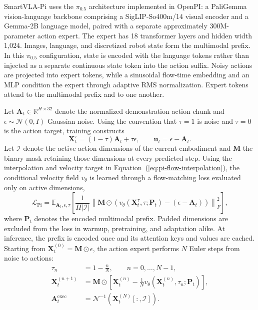 SmartVLA-Pi uses the $\pi_{0.5}$ architecture implemented in OpenPI:
a PaliGemma vision-language backbone comprising a SigLIP-So400m/14
visual encoder and a Gemma-2B language model, paired with a separate
approximately 300M-parameter action expert. The expert has 18 transformer
layers and hidden width 1,024. Images, language, and discretized robot
state form the multimodal prefix. In this $\pi_{0.5}$ configuration,
state is encoded with the language tokens rather than injected as a
separate continuous state token into the action suffix. Noisy actions
are projected into expert tokens, while a sinusoidal flow-time embedding
and an MLP condition the expert through adaptive RMS normalization.
Expert tokens attend to the multimodal prefix and to one another.

Let $\mathbf{A}_t\in\mathbb{R}^{H\times32}$ denote the normalized
demonstration action chunk and $\epsilon\sim\mathcal{N}(0,I)$ Gaussian
noise. Using the convention that $\tau=1$ is noise and $\tau=0$ is the
action target, training constructs
\begin{equation}
\label{eq:pi-flow-interpolation}
\mathbf{X}^{\tau}_t=(1-\tau)\mathbf{A}_t+\tau\epsilon,
\qquad \mathbf{u}_t=\epsilon-\mathbf{A}_t.
\end{equation}
Let $\mathcal{I}$ denote the active action dimensions of the current
embodiment and $\mathbf{M}$ the binary mask retaining those dimensions
at every predicted step. Using the interpolation and velocity target in
Equation~(\ref{eq:pi-flow-interpolation}), the conditional velocity field $v_\theta$
is learned through a flow-matching loss evaluated only on active dimensions,
\begin{equation}
\label{eq:pi-flow-loss}
\mathcal{L}_{\mathrm{Pi}}=
\mathbb{E}_{\mathbf{A}_t,\epsilon,\tau}\!
\left[\frac{1}{H|\mathcal{I}|}\left\|
\mathbf{M}\odot\left(
v_\theta(\mathbf{X}^{\tau}_t,\tau;\mathbf{P}_t)
-(\epsilon-\mathbf{A}_t)\right)\right\|_F^2\right],
\end{equation}
where $\mathbf{P}_t$ denotes the encoded multimodal prefix. Padded
dimensions are excluded from the loss in warmup, pretraining, and adaptation alike.
At inference, the prefix is encoded once and its attention keys and
values are cached. Starting from
$\mathbf{X}^{(0)}_t=\mathbf{M}\odot\epsilon$, the action expert performs
$N$ Euler steps from noise to actions:
\begin{equation}
\label{eq:pi-flow-inference}
\begin{aligned}
\tau_n&=1-\frac{n}{N},\qquad n=0,\ldots,N-1,\\
\mathbf{X}^{(n+1)}_t&=\mathbf{M}\odot\left[
\mathbf{X}^{(n)}_t-\frac{1}{N}v_\theta(\mathbf{X}^{(n)}_t,\tau_n;\mathbf{P}_t)\right],\\
\mathbf{A}^{\mathrm{exec}}_t&=
\mathcal{N}^{-1}\!\left(\mathbf{X}^{(N)}_t[:,\mathcal{I}]\right).
\end{aligned}
\end{equation}
